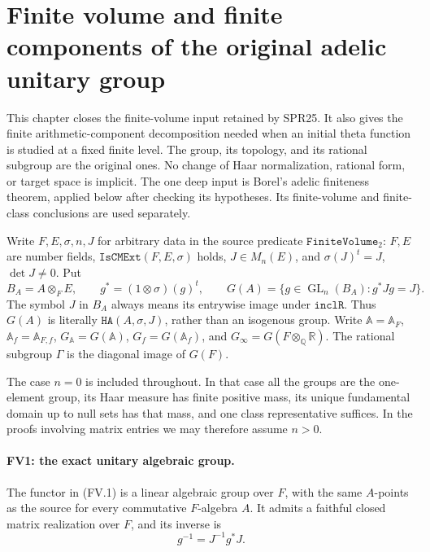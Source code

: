 \section{Finite volume and finite components of the original adelic unitary group}
\label{sec:finite-volume-original}

This chapter closes the finite-volume input retained by SPR25.  It also
gives the finite arithmetic-component decomposition needed when an
initial theta function is studied at a fixed finite level.  The group,
its topology, and its rational subgroup are the original ones.  No
change of Haar normalization, rational form, or target space is implicit.
The one deep input is Borel's adelic finiteness theorem, applied below
after checking its hypotheses.  Its finite-volume and finite-class
conclusions are used separately.

Write \(F,E,\sigma,n,J\) for arbitrary data in the source predicate
\(\texttt{FiniteVolume}_2\): \(F,E\) are number fields,
\(\texttt{IsCMExt}(F,E,\sigma)\) holds, \(J\in M_n(E)\), and
\(\sigma(J)^t=J\), \(\det J\ne0\).  Put
\[
 B_A=A\otimes_F E,\qquad
 g^*=(1\otimes\sigma)(g)^t,\qquad
 G(A)=\{g\in\operatorname{GL}_n(B_A):g^*Jg=J\}.
 \tag{FV.1}
\]
The symbol \(J\) in \(B_A\) always means its entrywise image under
\(\texttt{inclR}\).  Thus \(G(A)\) is literally
\(\texttt{HA}(A,\sigma,J)\), rather than an isogenous group.  Write
\(\mathbb A=\mathbb A_F\), \(\mathbb A_f=\mathbb A_{F,f}\),
\(G_{\mathbb A}=G(\mathbb A)\), \(G_f=G(\mathbb A_f)\), and
\(G_\infty=G(F\otimes_{\mathbb Q}\mathbb R)\).  The rational subgroup
\(\Gamma\) is the diagonal image of \(G(F)\).

The case \(n=0\) is included throughout.  In that case all the groups
are the one-element group, its Haar measure has finite positive mass,
its unique fundamental domain up to null sets has that mass, and one
class representative suffices.  In the proofs involving matrix entries
we may therefore assume \(n>0\).

\paragraph{FV1: the exact unitary algebraic group.}
\label{claim:FV1}
The functor in (FV.1) is a linear algebraic group over \(F\), with the
same \(A\)-points as the source for every commutative \(F\)-algebra \(A\).
It admits a faithful closed matrix realization over \(F\), and its
inverse is
\[
                    g^{-1}=J^{-1}g^*J.
 \tag{FV.2}
\]

